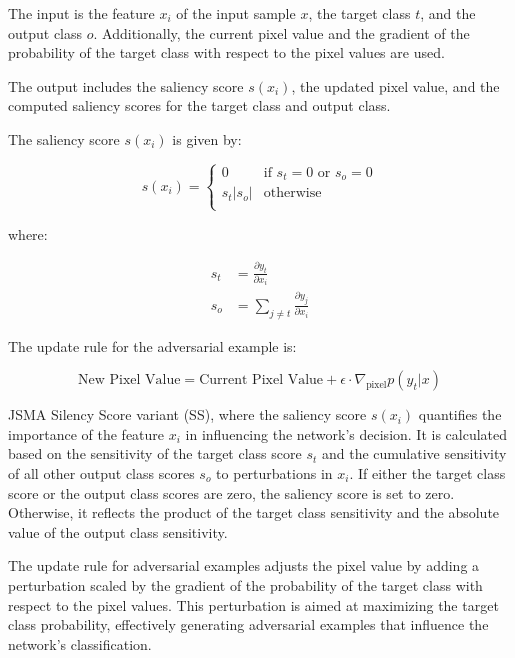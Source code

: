 The input is the feature \( x_i \) of the input sample \( x \), the target class \( t \), and the output class \( o \). Additionally, the current pixel value and the gradient of the probability of the target class with respect to the pixel values are used.

The output includes the saliency score \( s(x_i) \), the updated pixel value, and the computed saliency scores for the target class and output class.

The saliency score \( s(x_i) \) is given by:

\begin{equation*}
s(x_i) = 
\begin{cases}
0 & \text{if } s_t = 0 \text{ or } s_o = 0 \\
s_t |s_o| & \text{otherwise} \\
\end{cases}
\end{equation*}

where:

\begin{align*}
s_t &= \frac{\partial y_t}{\partial x_i} \\
s_o &= \sum_{j \neq t} \frac{\partial y_j}{\partial x_i}
\end{align*}

The update rule for the adversarial example is:

\begin{equation*}
\text{New Pixel Value} = \text{Current Pixel Value} + \epsilon \cdot \nabla_{\text{pixel}} p(y_t | x)
\end{equation*}

JSMA Silency Score variant (SS), where the saliency score \( s(x_i) \) quantifies the importance of the feature \( x_i \) in influencing the network's decision. It is calculated based on the sensitivity of the target class score \( s_t \) and the cumulative sensitivity of all other output class scores \( s_o \) to perturbations in \( x_i \). If either the target class score or the output class scores are zero, the saliency score is set to zero. Otherwise, it reflects the product of the target class sensitivity and the absolute value of the output class sensitivity.

The update rule for adversarial examples adjusts the pixel value by adding a perturbation scaled by the gradient of the probability of the target class with respect to the pixel values. This perturbation is aimed at maximizing the target class probability, effectively generating adversarial examples that influence the network's classification.
